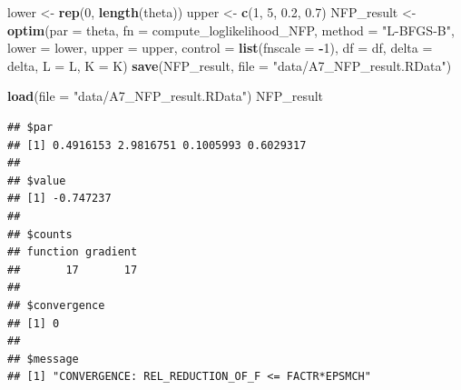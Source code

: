 \documentclass[]{book}
\newenvironment{Shaded}{\begin{snugshade}}{\end{snugshade}}
\newcommand{\KeywordTok}[1]{\textcolor[rgb]{0.13,0.29,0.53}{\textbf{#1}}}
\newcommand{\DataTypeTok}[1]{\textcolor[rgb]{0.13,0.29,0.53}{#1}}
\newcommand{\DecValTok}[1]{\textcolor[rgb]{0.00,0.00,0.81}{#1}}
\newcommand{\FloatTok}[1]{\textcolor[rgb]{0.00,0.00,0.81}{#1}}
\newcommand{\StringTok}[1]{\textcolor[rgb]{0.31,0.60,0.02}{#1}}
\newcommand{\OperatorTok}[1]{\textcolor[rgb]{0.81,0.36,0.00}{\textbf{#1}}}
\newcommand{\NormalTok}[1]{#1}
\begin{document}
\begin{Shaded}
\begin{Highlighting}[]
\NormalTok{lower <-}\StringTok{ }\KeywordTok{rep}\NormalTok{(}\DecValTok{0}\NormalTok{, }\KeywordTok{length}\NormalTok{(theta))}
\NormalTok{upper <-}\StringTok{ }\KeywordTok{c}\NormalTok{(}\DecValTok{1}\NormalTok{, }\DecValTok{5}\NormalTok{, }\FloatTok{0.2}\NormalTok{, }\FloatTok{0.7}\NormalTok{)}
\NormalTok{NFP_result <-}
\StringTok{  }\KeywordTok{optim}\NormalTok{(}\DataTypeTok{par =}\NormalTok{ theta,}
        \DataTypeTok{fn =}\NormalTok{ compute_loglikelihood_NFP,}
        \DataTypeTok{method =} \StringTok{"L-BFGS-B"}\NormalTok{,}
        \DataTypeTok{lower =}\NormalTok{ lower,}
        \DataTypeTok{upper =}\NormalTok{ upper,}
        \DataTypeTok{control =} \KeywordTok{list}\NormalTok{(}\DataTypeTok{fnscale =} \OperatorTok{-}\DecValTok{1}\NormalTok{),}
        \DataTypeTok{df =}\NormalTok{ df, }
        \DataTypeTok{delta =}\NormalTok{ delta,}
        \DataTypeTok{L =}\NormalTok{ L,}
        \DataTypeTok{K =}\NormalTok{ K)}
\KeywordTok{save}\NormalTok{(NFP_result, }\DataTypeTok{file =} \StringTok{"data/A7_NFP_result.RData"}\NormalTok{)}
\end{Highlighting}
\end{Shaded}

\begin{Shaded}
\begin{Highlighting}[]
\KeywordTok{load}\NormalTok{(}\DataTypeTok{file =} \StringTok{"data/A7_NFP_result.RData"}\NormalTok{)}
\NormalTok{NFP_result}
\end{Highlighting}
\end{Shaded}

\begin{verbatim}
## $par
## [1] 0.4916153 2.9816751 0.1005993 0.6029317
## 
## $value
## [1] -0.747237
## 
## $counts
## function gradient 
##       17       17 
## 
## $convergence
## [1] 0
## 
## $message
## [1] "CONVERGENCE: REL_REDUCTION_OF_F <= FACTR*EPSMCH"
\end{verbatim}

\begin{Shaded}
\end{Shaded}
\end{document}
